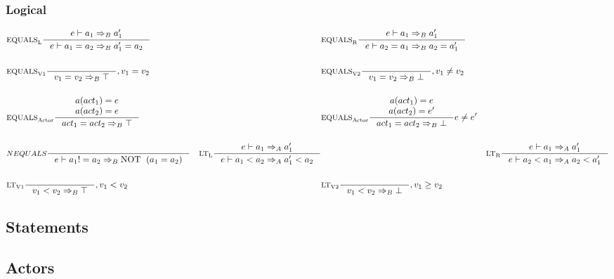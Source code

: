 \subsubsection{Logical}
\begin{align*}
&\inference[$\text{EQUALS}_\text{L}$]{e \vdash a_1 \Rightarrow_B a_1'}
                    {e \vdash a_1 = a_2 \Rightarrow_B a_1' = a_2}
&
&\inference[$\text{EQUALS}_\text{R}$]{e \vdash a_1 \Rightarrow_B a_1'}
                    {e \vdash a_2 = a_1 \Rightarrow_B a_2 = a_1'}
\\\\
&\inference[$\text{EQUALS}_\text{V1}$]{}
                    {v_1 = v_2 \Rightarrow_B \top}
                    {, v_1 = v_2}
&
&\inference[$\text{EQUALS}_\text{V2}$]{}
                    {v_1 = v_2 \Rightarrow_B \bot}
                    {, v_1 \neq v_2}
\\\\
&\inference[$\text{EQUALS}_\text{Actor}$]{a(act_1) = e\\ a(act_2) = e}
                    {act_1 = act_2 \Rightarrow_B \top}
&
&\inference[$\text{EQUALS}_\text{Actor}$]{a(act_1) = e\\ a(act_2) = e'}
                    {act_1 = act_2 \Rightarrow_B \bot}
                    {e \neq e'}
\\\\
&\inference[$NEQUALS$]{}
                    {e \vdash a_1 != a_2 \Rightarrow_B \Tnot (a_1 = a_2)}
&\inference[$\text{LT}_\text{L}$]{e \vdash a_1 \Rightarrow_A a_1'}
                    {e \vdash a_1 < a_2 \Rightarrow_A a_1' < a_2}
&
&\inference[$\text{LT}_\text{R}$]{e \vdash a_1 \Rightarrow_A a_1'}
                    {e \vdash a_2 < a_1 \Rightarrow_A a_2 < a_1'}
\\\\
&\inference[$\text{LT}_\text{V1}$]{}
                    {v_1 < v_2 \Rightarrow_B \top}
                    {, v_1 < v_2}
&
&\inference[$\text{LT}_\text{V2}$]{}
                    {v_1 < v_2 \Rightarrow_B \bot}
                    {, v_1 \geq v_2}
\end{align*}
\subsection{Statements}

\subsection{Actors}
